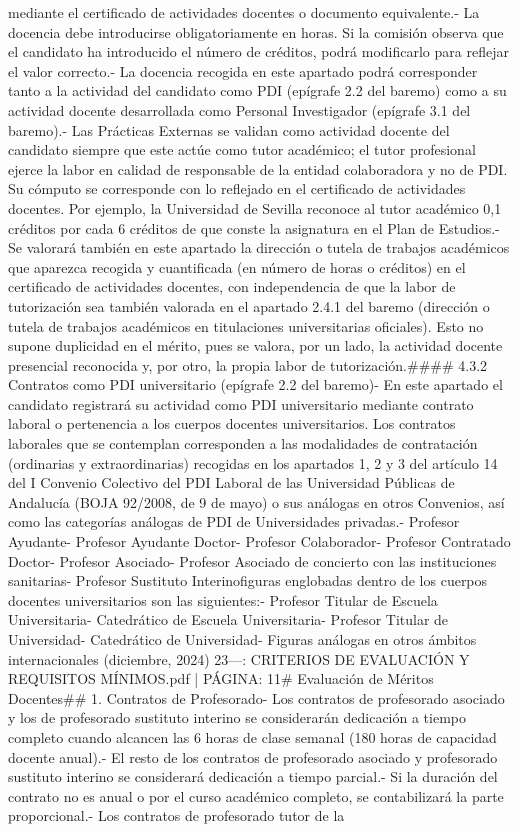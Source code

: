 \documentclass{article}
\begin{document}
\begin{itemize}
{{mediante el certificado de actividades docentes o documento equivalente.\n- La docencia debe introducirse obligatoriamente en horas. Si la comisión observa que el candidato ha introducido el número de créditos, podrá modificarlo para reflejar el valor correcto.\n- La docencia recogida en este apartado podrá corresponder tanto a la actividad del candidato como PDI (epígrafe 2.2 del baremo) como a su actividad docente desarrollada como Personal Investigador (epígrafe 3.1 del baremo).\n- Las Prácticas Externas se validan como actividad docente del candidato siempre que este actúe como tutor académico; el tutor profesional ejerce la labor en calidad de responsable de la entidad colaboradora y no de PDI. Su cómputo se corresponde con lo reflejado en el certificado de actividades docentes. Por ejemplo, la Universidad de Sevilla reconoce al tutor académico 0,1 créditos por cada 6 créditos de que conste la asignatura en el Plan de Estudios.\n- Se valorará también en este apartado la dirección o tutela de trabajos académicos que aparezca recogida y cuantificada (en número de horas o créditos) en el certificado de actividades docentes, con independencia de que la labor de tutorización sea también valorada en el apartado 2.4.1 del baremo (dirección o tutela de trabajos académicos en titulaciones universitarias oficiales). Esto no supone duplicidad en el mérito, pues se valora, por un lado, la actividad docente presencial reconocida y, por otro, la propia labor de tutorización.\n\n#### 4.3.2 Contratos como PDI universitario (epígrafe 2.2 del baremo)\n\n- En este apartado el candidato registrará su actividad como PDI universitario mediante contrato laboral o pertenencia a los cuerpos docentes universitarios. Los contratos laborales que se contemplan corresponden a las modalidades de contratación (ordinarias y extraordinarias) recogidas en los apartados 1, 2 y 3 del artículo 14 del I Convenio Colectivo del PDI Laboral de las Universidad Públicas de Andalucía (BOJA 92/2008, de 9 de mayo) o sus análogas en otros Convenios, así como las categorías análogas de PDI de Universidades privadas.\n- Profesor Ayudante\n- Profesor Ayudante Doctor\n- Profesor Colaborador\n- Profesor Contratado Doctor\n- Profesor Asociado\n- Profesor Asociado de concierto con las instituciones sanitarias\n- Profesor Sustituto Interino\n\nLas figuras englobadas dentro de los cuerpos docentes universitarios son las siguientes:\n- Profesor Titular de Escuela Universitaria\n- Catedrático de Escuela Universitaria\n- Profesor Titular de Universidad\n- Catedrático de Universidad\n- Figuras análogas en otros ámbitos internacionales\n{} (diciembre, 2024) 23\n\n---\n\nFUENTE: CRITERIOS DE EVALUACIÓN Y REQUISITOS MÍNIMOS.pdf | PÁGINA: 11\n# Evaluación de Méritos Docentes\n\n## 1. Contratos de Profesorado\n\n- Los contratos de profesorado asociado y los de profesorado sustituto interino se considerarán dedicación a tiempo completo cuando alcancen las 6 horas de clase semanal (180 horas de capacidad docente anual).\n- El resto de los contratos de profesorado asociado y profesorado sustituto interino se considerará dedicación a tiempo parcial.\n- Si la duración del contrato no es anual o por el curso académico completo, se contabilizará la parte proporcional.\n- Los contratos de profesorado tutor de la }}
\end{itemize}
\end{document}
